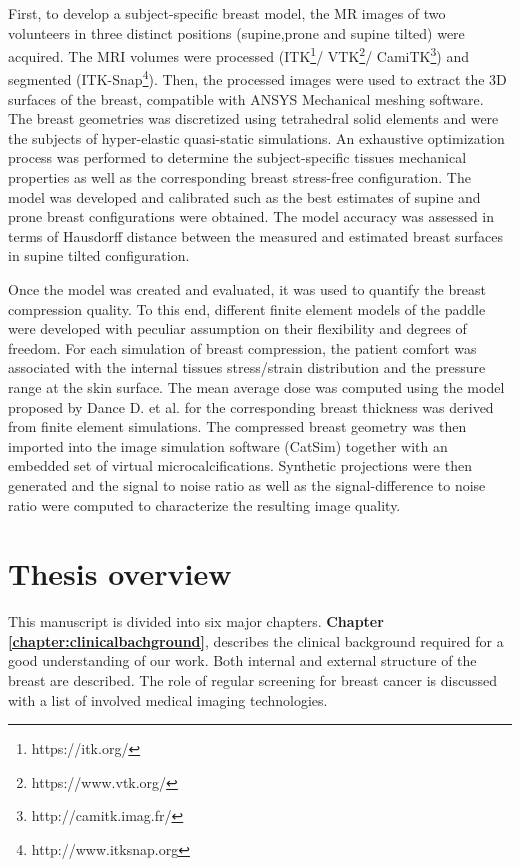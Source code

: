 First, to develop a subject-specific breast model, the MR images of two volunteers in three distinct positions (supine,prone and supine tilted) were acquired. The MRI volumes were processed (ITK\footnote{https://itk.org/}/ VTK\footnote{https://www.vtk.org/}/ CamiTK\footnote{http://camitk.imag.fr/}) and segmented (ITK-Snap\footnote{http://www.itksnap.org}). Then, the processed images were used to extract the 3D surfaces of the breast, compatible with ANSYS Mechanical meshing software. The breast geometries was discretized using tetrahedral solid elements and were the subjects of hyper-elastic quasi-static simulations. An exhaustive optimization process was performed to determine the subject-specific tissues mechanical properties as well as the corresponding breast stress-free configuration. The model was developed and calibrated such as the best estimates of supine and prone breast configurations were obtained. The model accuracy was assessed in terms of Hausdorff distance between the measured and estimated breast surfaces in supine tilted configuration.

Once the model was created and evaluated, it was used to quantify the breast compression quality. To this end, different finite element models of the paddle were developed with peculiar assumption on their flexibility and degrees of freedom. For each simulation of breast compression, the patient comfort was associated with the internal tissues stress/strain distribution and the pressure range at the skin surface. The mean average dose was computed using the model proposed by Dance D. et al. \cite{dance_additional_2000} for the corresponding breast thickness was derived from finite element simulations. The compressed breast geometry was then imported into the image simulation software (CatSim) together with an embedded set of virtual microcalcifications. Synthetic projections were then generated and the signal to noise ratio as well as the signal-difference to noise ratio were computed to characterize the resulting image quality.   

\cleardoublepage
\chapter*{Thesis overview}\label{section:thesisoverview}

This manuscript is divided into six major chapters.  \textbf{Chapter \ref{chapter:clinicalbachground}}, describes the clinical background  required for a good understanding of our work. Both internal and external structure of the breast are described. The role of regular screening for breast cancer is discussed with a list of involved medical imaging technologies. 

